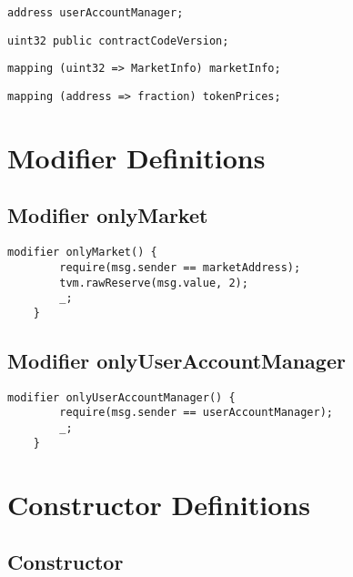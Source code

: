 \begin{lstlisting}[firstnumber=12]
    address userAccountManager;
\end{lstlisting}

\begin{lstlisting}[firstnumber=13]
    uint32 public contractCodeVersion;
\end{lstlisting}

\begin{lstlisting}[firstnumber=15]
    mapping (uint32 => MarketInfo) marketInfo;
\end{lstlisting}

\begin{lstlisting}[firstnumber=16]
    mapping (address => fraction) tokenPrices;
\end{lstlisting}

\section{Modifier Definitions}


\subsection{Modifier onlyMarket}


\begin{lstlisting}[firstnumber=190]
    modifier onlyMarket() {
        require(msg.sender == marketAddress);
        tvm.rawReserve(msg.value, 2);
        _;
    }
\end{lstlisting}

\subsection{Modifier onlyUserAccountManager}


\begin{lstlisting}[firstnumber=196]
    modifier onlyUserAccountManager() {
        require(msg.sender == userAccountManager);
        _;
    }
\end{lstlisting}

\section{Constructor Definitions}


\subsection{Constructor}

